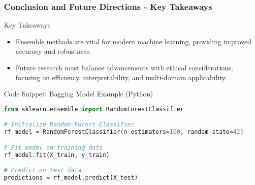 \documentclass[aspectratio=169]{beamer}
\begin{document}
\begin{frame}[fragile]
  \frametitle{Conclusion and Future Directions - Key Takeaways}
  \begin{block}{Key Takeaways}
    \begin{itemize}
      \item Ensemble methods are vital for modern machine learning, providing improved accuracy and robustness.
      \item Future research must balance advancements with ethical considerations, focusing on efficiency, interpretability, and multi-domain applicability.
    \end{itemize}
  \end{block}
  
  \begin{block}{Code Snippet: Bagging Model Example (Python)}
    \begin{lstlisting}[language=Python]
from sklearn.ensemble import RandomForestClassifier

# Initialize Random Forest Classifier
rf_model = RandomForestClassifier(n_estimators=100, random_state=42)

# Fit model on training data
rf_model.fit(X_train, y_train)

# Predict on test data
predictions = rf_model.predict(X_test)
    \end{lstlisting}
  \end{block}
\end{frame}
\end{document}
